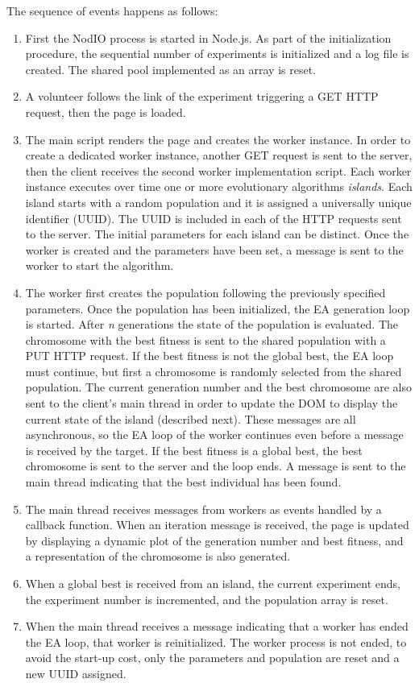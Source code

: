 \documentclass[journal,onecolumn]{IEEEtran}
\begin{document}
The sequence of events happens as follows:
\begin{enumerate}
\item First the {\sf NodIO} process is started in Node.js. As part of the
initialization procedure, the sequential number of experiments is initialized and a log
file is created. The shared pool implemented as an array is reset.
\item A volunteer follows the link of the experiment triggering a GET HTTP
request, then the page is loaded.
\item The main script renders the page and creates the worker instance. In
order to create a dedicated worker instance, another GET request is sent to the
server, then the client receives the second worker implementation script.
Each worker instance executes over time one or more evolutionary algorithms
{\em islands}. Each island starts with a random population and it is assigned a
universally unique identifier (UUID). The UUID is included in each of the HTTP
requests sent to the server.
The initial parameters for each island
can be distinct. Once the worker is created and the parameters have been set,
a message is sent to the worker to start the algorithm.
\item The worker first creates the population following the previously
specified parameters. Once the population has been initialized, the EA
generation loop is started. After {\em n} generations the state of the population
is evaluated. The chromosome with the best fitness is sent to the shared
population with a PUT HTTP request. If the best fitness is not the global best,
the EA loop must continue, but first a chromosome is randomly selected from
the shared population. The current generation number and the best
chromosome are also sent to the client's main thread in order to update the DOM to
display the current state of the island (described next). These messages are
all asynchronous, so the EA loop of
the worker continues even before a message is received by the target. If the best fitness is a global best, the best
chromosome is sent to the server and the loop ends. A message is sent to the
main thread indicating that the best individual has been found.
\item The main thread receives messages from workers as events handled by
a callback function. When an iteration message is received, the page is
updated by displaying a dynamic plot of the generation number and best
fitness, and a representation of the chromosome is also generated.
\item When a global best is received from an island, the current experiment
ends, the experiment number is incremented, and the population array is reset.
\item When the main thread receives a message indicating that a worker has ended the EA
loop, that worker is reinitialized. The worker process is not ended, to
avoid the start-up cost, only the parameters and population are reset and a new UUID
assigned.
\end{enumerate}
\end{document}

